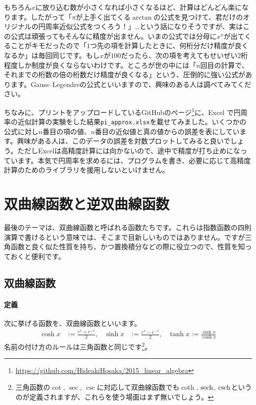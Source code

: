 もちろん$x$に放り込む数が小さくなれば小さくなるほど、計算はどんどん楽になります。したがって「$\pi$が上手く出てくる$\arctan$の公式を見つけて、君だけのオリジナルの円周率近似公式をつくろう！」…という話になりそうですが、実はこの公式は頑張ってもそんなに精度が出ません。いまの公式では分母に$x^n$が出てくることがキモだったので「$1$つ先の項を計算したときに、何桁分だけ精度が良くなるか」は毎回同じです。もし$x$が$100$だったら、次の項を考えてもせいぜい$2$桁程度しか制度が良くならないわけです。ところが世の中には「$n$回目の計算で、それまでの桁数の倍の桁数だけ精度が良くなる」という、圧倒的に強い公式があります。Gauss--Legendreの公式といいますので、興味のある人は調べてみてください。

ちなみに、プリントをアップロードしているGitHubのページ\footnote{\url{https://github.com/HideakiHosaka/2015_linear_algebra}}に、Excel で円周率の近似計算の実験をした結果\texttt{pi\_approx.xlsx}を載せてみました。いくつかの公式に対し$n$番目の項の値、$n$番目の近似値と真の値からの誤差を表にしています。興味がある人は、このデータの誤差を対数プロットしてみると良いでしょう。ただしExcelは高精度計算には向かないので、途中で精度が打ち止めになっています。本気で円周率を求めるには、プログラムを書き、必要に応じて高精度計算のためのライブラリを援用しないといけません。

\section{双曲線函数と逆双曲線函数}

最後のテーマは、双曲線函数と呼ばれる函数たちです。これらは指数函数の四則演算で書けるという意味では、そこまで目新しいものではありません。ですが三角函数と良く似た性質を持ち、かつ置換積分などの際に役立つので、性質を知っておくと便利です。

\subsection{双曲線函数}

\paragraph{定義}
次に挙げる函数を、双曲線函数といいます。
\begin{align*}
\cosh x &:= \frac{e^x+e^{-x}}{2}, & \sinh x &:= \frac{e^x - e^{-x}}{2}, & \tanh x := \frac{\sinh x}{\cosh x}
\end{align*}
名前の付け方のルールは三角函数と同じです\footnote{三角函数の$\cot$, $\sec$, $\csc$に対応して双曲線函数でも$\coth$, $\operatorname{sech}$, $\operatorname{csch}$というのが定義されますが、これらを使う場面はまず無いでしょう。}。

